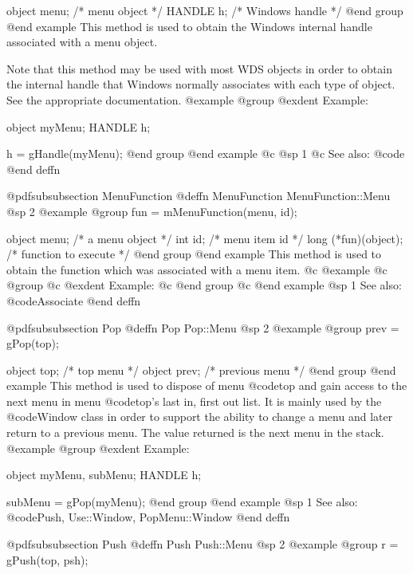 object  menu;   /*  menu object    */
HANDLE  h;      /*  Windows handle */
@end group
@end example
This method is used to obtain the Windows internal handle associated with
a menu object.  

Note that this method may be used with most WDS objects in order to obtain
the internal handle that Windows normally associates with each type of object.
See the appropriate documentation.
@example
@group
@exdent Example:

object  myMenu;
HANDLE  h;

h = gHandle(myMenu);
@end group
@end example
@c @sp 1
@c See also:  @code{}
@end deffn









@pdfsubsubsection {MenuFunction}
@deffn {MenuFunction} MenuFunction::Menu
@sp 2
@example
@group
fun = mMenuFunction(menu, id);

object  menu;   /*  a menu object     */
int     id;     /*  menu item id      */
long    (*fun)(object);  /*  function to execute  */
@end group
@end example
This method is used to obtain the function which was associated with a
menu item.
@c @example
@c @group
@c @exdent Example:
@c @end group
@c @end example
@sp 1
See also:  @code{Associate}
@end deffn







@pdfsubsubsection {Pop}
@deffn {Pop} Pop::Menu
@sp 2
@example
@group
prev = gPop(top);

object  top;    /*  top menu       */
object  prev;   /*  previous menu  */
@end group
@end example
This method is used to dispose of menu @code{top} and gain access to the
next menu in menu @code{top}'s last in, first out list.  It is mainly
used by the @code{Window} class in order to support the ability to
change a menu and later return to a previous menu.  The value returned
is the next menu in the stack.
@example
@group
@exdent Example:

object  myMenu, subMenu;
HANDLE  h;

subMenu = gPop(myMenu);
@end group
@end example
@sp 1
See also:  @code{Push, Use::Window, PopMenu::Window}
@end deffn






@pdfsubsubsection {Push}
@deffn {Push} Push::Menu
@sp 2
@example
@group
r = gPush(top, psh);

